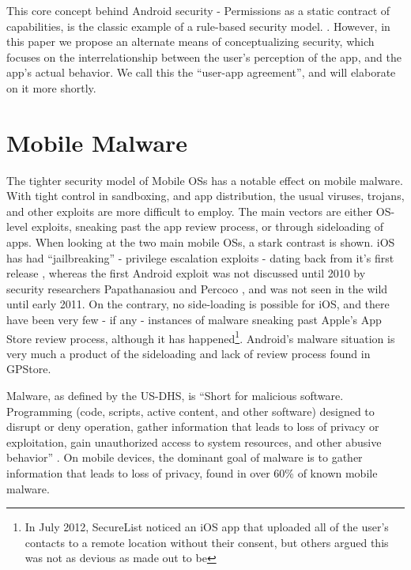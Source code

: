 This core concept behind Android security - Permissions as a static contract of capabilities, is the classic example of a rule-based security model. . However, in this paper we propose an alternate means of conceptualizing security, which focuses on the interrelationship between the user's perception of the app, and the app's actual behavior. We call this the ``user-app agreement'', and will elaborate on it more shortly. 

\section{Mobile Malware}
The tighter security model of Mobile OSs has a notable effect on mobile malware. With tight control in sandboxing, and app distribution, the usual viruses, trojans, and other exploits are more difficult to employ. The main vectors are either OS-level exploits, sneaking past the app review process, or through sideloading of apps. When looking at the two main mobile OSs, a stark contrast is shown. iOS has had  ``jailbreaking'' - privilege escalation exploits - dating back from it's first release \citep{damopoulos2011isam}, whereas the first Android exploit was not discussed until 2010 by security researchers Papathanasiou and Percoco \citep{papathanasiou2010not}, and was not seen in the wild until early 2011\citep{castillo2010android}. On the contrary, no side-loading is possible for iOS, and there have been very few - if any - instances of malware sneaking past Apple's App Store review process, although it has happened\footnote{In July 2012, SecureList noticed an iOS app that uploaded all of the user's contacts to a remote location without their consent\citep{SecureList2012}, but others argued this was not as devious as made out to be\citep{trendmicroios2012} }. Android's malware situation is very much a product of the sideloading and lack of review process found in GPStore. %

Malware, as defined by the US-DHS, is ``Short for malicious software. Programming (code, scripts, active content, and other software) designed to disrupt or deny operation, gather information that leads to loss of privacy or exploitation, gain unauthorized access to system resources, and other abusive behavior'' \citep{nash2005undirected}. On mobile devices, the dominant goal of malware is to gather information that leads to loss of privacy, found in over 60\% of known mobile malware\citep{felt2011survey}. 

